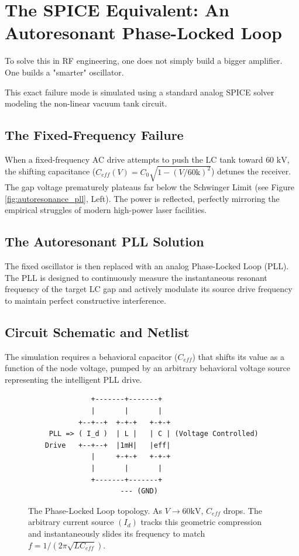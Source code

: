 \section{The SPICE Equivalent: An Autoresonant Phase-Locked Loop}
To solve this in RF engineering, one does not simply build a bigger amplifier. One builds a "smarter" oscillator.

This exact failure mode is simulated using a standard analog SPICE solver modeling the non-linear vacuum tank circuit.

\subsection{The Fixed-Frequency Failure}
When a fixed-frequency AC drive attempts to push the LC tank toward $60 \text{ kV}$, the shifting capacitance ($C_{eff}(V) = C_0 \sqrt{1 - (V/60\text{k})^2}$) detunes the receiver. The gap voltage prematurely plateaus far below the Schwinger Limit (see Figure \ref{fig:autoresonance_pll}, Left). The power is reflected, perfectly mirroring the empirical struggles of modern high-power laser facilities.

\subsection{The Autoresonant PLL Solution}
The fixed oscillator is then replaced with an analog Phase-Locked Loop (PLL). The PLL is designed to continuously measure the instantaneous resonant frequency of the target LC gap and actively modulate its source drive frequency to maintain perfect constructive interference.

\subsection{Circuit Schematic and Netlist}
The simulation requires a behavioral capacitor ($C_{eff}$) that shifts its value as a function of the node voltage, pumped by an arbitrary behavioral voltage source representing the intelligent PLL drive.

\begin{figure}[h!]
    \centering
    \begin{tcolorbox}[colback=black!5!white, colframe=black!75!white, title=Simplified LTspice Equivalent Circuit]
    \centering
    \begin{verbatim}
               +-------+-------+
               |       |       |
            +--+--+  +-+-+   +-+-+
     PLL => ( I_d )  | L |   | C | (Voltage Controlled)
    Drive   +--+--+  |1mH|   |eff|
               |     +-+-+   +-+-+
               |       |       |
               +-------+-------+
                      --- (GND)
    \end{verbatim}
    \end{tcolorbox}
    \caption{The Phase-Locked Loop topology. As $V \to 60\text{kV}$, $C_{eff}$ drops. The arbitrary current source $(I_d)$ tracks this geometric compression and instantaneously slides its frequency to match $f = 1/(2\pi\sqrt{LC_{eff}})$.}
\end{figure}

